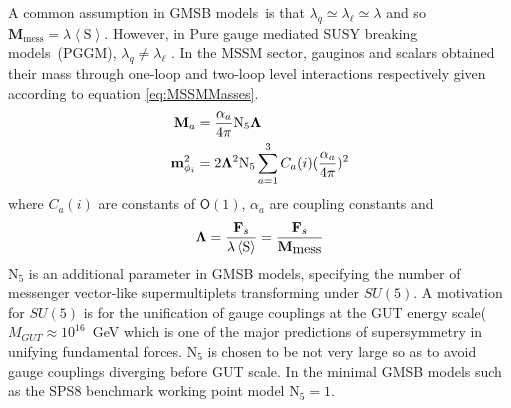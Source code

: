 {A common assumption in GMSB models~\cite{GMSB}is that $\lambda_{q} \simeq \lambda_{\ell} \simeq \lambda $ and so $\mathbf{M}_{\mbox{mess}} = \lambda \left\langle \mathrm{S} \right\rangle$. However, in  Pure gauge mediated SUSY breaking models~(PGGM), $\lambda_{q} \neq \lambda_{\ell}$ \cite{PGGM}.
In the MSSM sector, gauginos and scalars obtained their mass through one-loop and two-loop level interactions respectively given according to equation \ref{eq:MSSMMasses}.
\begin{align}{\label{eq:MSSMMasses}}
\mathbf{M}_{a} &= \frac{\alpha_{a}}{4\pi}\mathrm{N_{5}}\mathbf{\Lambda} \\ 
\mathbf{m}^{2}_{\phi_{i}} &= 2\mathbf{\Lambda}^{2}\mathrm{N_{5}}\sum_{a=1}^{3}C_{a}(i) ( \frac{\alpha_{a}}{4\pi})^{2}
\end{align}
where $C_{a}(i)$ are constants of $\mathsf{O}(1)$, $\alpha_{a}$ are coupling constants and 
\begin{equation}{\label{eq:Lambda}}
\mathbf{\Lambda} = \frac{\mathbf{F}_{s}}{\lambda \left\langle \mathrm{S} \right\rangle } = \frac{\mathbf{F}_{s}}{\mathbf{M}_{\mbox{mess}}}
\end{equation} 
$\mathrm{N_{5}}$ is an additional parameter in GMSB models, specifying the number of messenger vector-like supermultiplets transforming under $SU(5)$. A motivation for $SU(5)$ is for the unification of gauge couplings at the GUT energy scale($M_{GUT} \approx 10^{16}$~GeV which is one of the major predictions of supersymmetry in unifying fundamental forces.
$\mathrm{N_{5}}$ is chosen to be not very large so as to avoid gauge couplings diverging before GUT scale. In the minimal GMSB models such as the SPS8 benchmark working point model $\mathrm{N_{5}} = 1$.



}
